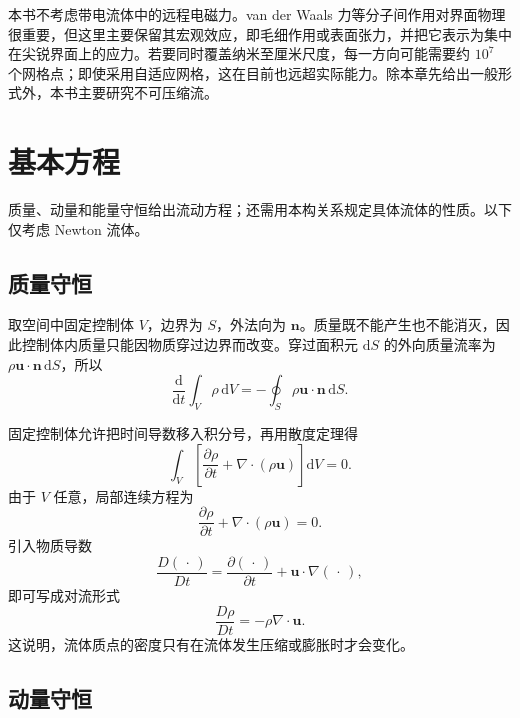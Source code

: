 \documentclass[11pt,a4paper,openany,fontset=none]{ctexbook}
\newenvironment{sourceblock}
  {\par\addvspace{0.65\baselineskip}\noindent\begin{minipage}{\linewidth}\centering}
  {\end{minipage}\par\addvspace{0.48\baselineskip}}
\begin{document}
本书不考虑带电流体中的远程电磁力。van der Waals 力等分子间作用对界面物理很重要，但这里主要保留其宏观效应，即毛细作用或表面张力，并把它表示为集中在尖锐界面上的应力。若要同时覆盖纳米至厘米尺度，每一方向可能需要约 $10^7$ 个网格点；即使采用自适应网格，这在目前也远超实际能力。除本章先给出一般形式外，本书主要研究不可压缩流。

\section{基本方程}

质量、动量和能量守恒给出流动方程；还需用本构关系规定具体流体的性质。以下仅考虑 Newton 流体。

\subsection{质量守恒}

取空间中固定控制体 $V$，边界为 $S$，外法向为 $\bm n$。质量既不能产生也不能消灭，因此控制体内质量只能因物质穿过边界而改变。穿过面积元 $\mathrm dS$ 的外向质量流率为 $\rho\bm u\cdot\bm n\,\mathrm dS$，所以
\begin{equation}
 \frac{\mathrm d}{\mathrm dt}\int_V\rho\,\mathrm dV
 =-\oint_S\rho\bm u\cdot\bm n\,\mathrm dS .
 \tag{2.1}
\end{equation}
\begin{sourceblock}
\end{sourceblock}
固定控制体允许把时间导数移入积分号，再用散度定理得
\begin{equation}
 \int_V\left[\frac{\partial\rho}{\partial t}+\nabla\cdot(\rho\bm u)\right]\mathrm dV=0.
 \tag{2.2}
\end{equation}
由于 $V$ 任意，局部连续方程为
\begin{equation}
 \frac{\partial\rho}{\partial t}+\nabla\cdot(\rho\bm u)=0. \tag{2.3}
\end{equation}
引入物质导数
\begin{equation}
 \frac{D(\,\cdot\,)}{Dt}=\frac{\partial(\,\cdot\,)}{\partial t}+\bm u\cdot\nabla(\,\cdot\,), \tag{2.4}
\end{equation}
即可写成对流形式
\begin{equation}
 \frac{D\rho}{Dt}=-\rho\nabla\cdot\bm u . \tag{2.5}
\end{equation}
这说明，流体质点的密度只有在流体发生压缩或膨胀时才会变化。

\subsection{动量守恒}
\end{document}
